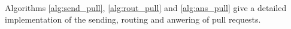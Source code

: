 Algorithms \ref{alg:send_pull}, \ref{alg:rout_pull} and \ref{alg:ans_pull} give a detailed implementation of the sending, routing and anwering of pull requests.







